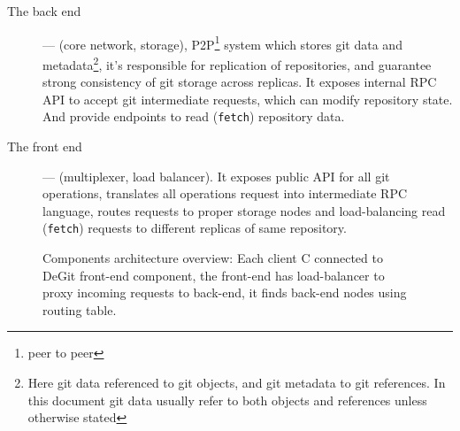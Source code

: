 \documentclass[acmlarge, screen, nonacm]{acmart}
\newcommand{\code}[1]{\texttt{#1}}
\begin{document}
\begin{description}
  \item[The back end] --- (core network, storage), P2P\footnote{peer to peer} system which stores git data
    and metadata\footnote{Here git data referenced to git objects, and git metadata to git references.
    In this document git data usually refer to both objects and references unless otherwise stated},
    it's responsible for replication of repositories, and guarantee
    strong consistency of git storage across replicas. It exposes internal RPC API to accept git intermediate
    requests, which can modify repository state. And provide endpoints to read (\code{fetch}) repository data.
  \item[The front end] --- (multiplexer, load balancer). It exposes public API for all git operations,
    translates all operations request into intermediate RPC language, routes requests to proper storage
    nodes and load-balancing read (\code{fetch}) requests to different replicas of same repository.
\end{description}

\begin{figure}
  \begin{center}
  \end{center}
  \caption{
    Components architecture overview:
    Each client C connected to DeGit front-end component,
    the front-end has load-balancer to proxy incoming requests to back-end,
    it finds back-end nodes using routing table.
  }\label{fig:comp-arc-overview}
\end{figure}
\end{document}
